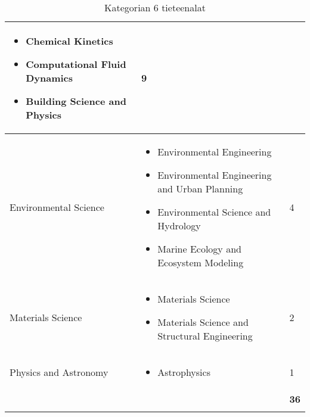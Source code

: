 \documentclass[utf8]{gradu3}
\begin{document}
\begin{longtable}[]{|p{5cm}|p{8cm}|p{1cm}|}
\begin{itemize}
        \item Chemical Kinetics
        \item Computational Fluid Dynamics
        \item Building Science and Physics
    \end{itemize} & 9 \\
    \hline
    Environmental Science & \begin{itemize}
        \item Environmental Engineering
        \item Environmental Engineering and Urban Planning
        \item Environmental Science and Hydrology
        \item Marine Ecology and Ecosystem Modeling
    \end{itemize} & 4 \\
    \hline
    Materials Science & \begin{itemize}
        \item Materials Science
        \item Materials Science and Structural Engineering
    \end{itemize} & 2 \\
    \hline
    Physics and Astronomy & \begin{itemize}
        \item Astrophysics
    \end{itemize} & 1 \\
    \hline
       &   & \textbf{36} \\
    \hline
    \caption{Kategorian 6 tieteenalat}
    \label{table:Kategorian 6 tieteenalat}
\end{longtable}
\end{document}
